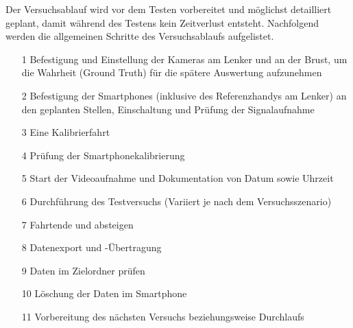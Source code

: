 Der Versuchsablauf wird vor dem Testen vorbereitet und möglichst detailliert geplant, damit während des Testens kein Zeitverlust entsteht.
Nachfolgend werden die allgemeinen Schritte des Versuchsablaufs aufgelistet.

\begin{itemize}
	\item[1] Befestigung und Einstellung der Kameras am Lenker und an der Brust, um die Wahrheit (Ground Truth) für die spätere Auswertung aufzunehmen
	\item[2] Befestigung der Smartphones (inklusive des Referenzhandys am Lenker) an den geplanten Stellen, Einschaltung und Prüfung der Signalaufnahme
	\item[3] Eine Kalibrierfahrt
	\item[4] Prüfung der Smartphonekalibrierung
	\item[5] Start der Videoaufnahme und Dokumentation von Datum sowie Uhrzeit
	\item[6] Durchführung des Testversuchs (Variiert je nach dem Versuchsszenario)
	\item[7] Fahrtende und absteigen
	\item[8] Datenexport und -Übertragung
	\item[9] Daten im Zielordner prüfen
	\item[10] Löschung der Daten im Smartphone
	\item[11] Vorbereitung des nächsten Versuchs beziehungsweise Durchlaufs
\end{itemize}

